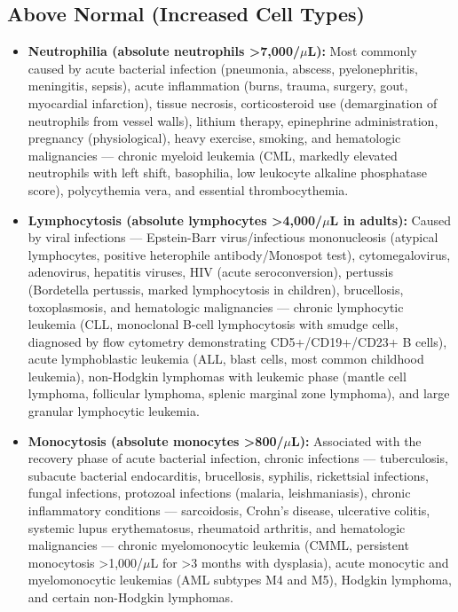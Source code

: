 \subsection*{Above Normal (Increased Cell Types)}
\begin{itemize}
  \item \textbf{Neutrophilia (absolute neutrophils >7,000/$\mu$L):} Most commonly caused by acute bacterial infection (pneumonia, abscess, pyelonephritis, meningitis, sepsis), acute inflammation (burns, trauma, surgery, gout, myocardial infarction), tissue necrosis, corticosteroid use (demargination of neutrophils from vessel walls), lithium therapy, epinephrine administration, pregnancy (physiological), heavy exercise, smoking, and hematologic malignancies --- chronic myeloid leukemia (CML, markedly elevated neutrophils with left shift, basophilia, low leukocyte alkaline phosphatase score), polycythemia vera, and essential thrombocythemia.
  \item \textbf{Lymphocytosis (absolute lymphocytes >4,000/$\mu$L in adults):} Caused by viral infections --- Epstein-Barr virus/infectious mononucleosis (atypical lymphocytes, positive heterophile antibody/Monospot test), cytomegalovirus, adenovirus, hepatitis viruses, HIV (acute seroconversion), pertussis (Bordetella pertussis, marked lymphocytosis in children), brucellosis, toxoplasmosis, and hematologic malignancies --- chronic lymphocytic leukemia (CLL, monoclonal B-cell lymphocytosis with smudge cells, diagnosed by flow cytometry demonstrating CD5+/CD19+/CD23+ B cells), acute lymphoblastic leukemia (ALL, blast cells, most common childhood leukemia), non-Hodgkin lymphomas with leukemic phase (mantle cell lymphoma, follicular lymphoma, splenic marginal zone lymphoma), and large granular lymphocytic leukemia.
  \item \textbf{Monocytosis (absolute monocytes >800/$\mu$L):} Associated with the recovery phase of acute bacterial infection, chronic infections --- tuberculosis, subacute bacterial endocarditis, brucellosis, syphilis, rickettsial infections, fungal infections, protozoal infections (malaria, leishmaniasis), chronic inflammatory conditions --- sarcoidosis, Crohn's disease, ulcerative colitis, systemic lupus erythematosus, rheumatoid arthritis, and hematologic malignancies --- chronic myelomonocytic leukemia (CMML, persistent monocytosis >1,000/$\mu$L for >3 months with dysplasia), acute monocytic and myelomonocytic leukemias (AML subtypes M4 and M5), Hodgkin lymphoma, and certain non-Hodgkin lymphomas.

\end{itemize}
